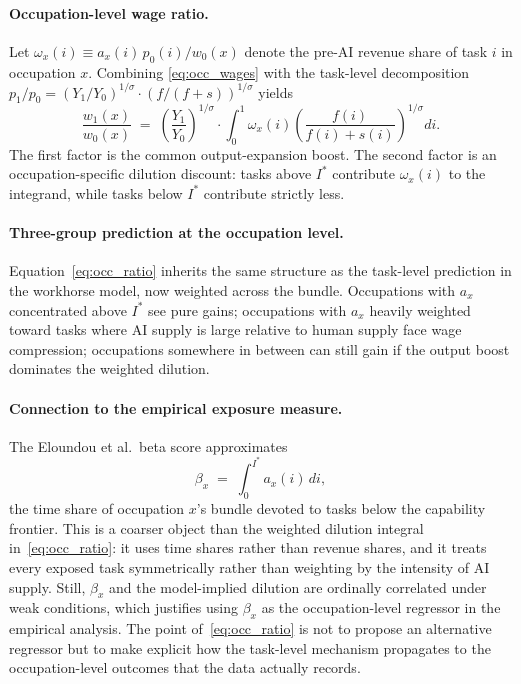\documentclass[11pt]{article}
\theoremstyle{plain}
\theoremstyle{remark}
\begin{document}
\paragraph{Occupation-level wage ratio.}
Let $\omega_x(i) \equiv a_x(i)\, p_0(i) / w_0(x)$ denote the pre-AI
revenue share of task $i$ in occupation $x$.  Combining
\eqref{eq:occ_wages} with the task-level decomposition $p_1/p_0 = (Y_1/Y_0)^{1/\sigma} \cdot (f/(f+s))^{1/\sigma}$ yields
\begin{equation}
  \frac{w_1(x)}{w_0(x)}
  \;=\; \left(\frac{Y_1}{Y_0}\right)^{1/\sigma}
  \cdot \int_0^1 \omega_x(i) \left(\frac{f(i)}{f(i)+s(i)}\right)^{1/\sigma} di.
  \label{eq:occ_ratio}
\end{equation}
The first factor is the common output-expansion boost.  The second
factor is an occupation-specific dilution discount: tasks above $I^*$
contribute $\omega_x(i)$ to the integrand, while tasks below $I^*$
contribute strictly less.

\paragraph{Three-group prediction at the occupation level.}
Equation~\eqref{eq:occ_ratio} inherits the same structure as the
task-level prediction in the workhorse model, now weighted across the
bundle.  Occupations with $a_x$ concentrated above $I^*$ see pure gains;
occupations with $a_x$ heavily weighted toward tasks where AI supply is
large relative to human supply face wage compression; occupations
somewhere in between can still gain if the output boost dominates the
weighted dilution.

\paragraph{Connection to the empirical exposure measure.}
The Eloundou et al.\ beta score approximates
\[
  \beta_x \;=\; \int_0^{I^*} a_x(i)\, di,
\]
the time share of occupation $x$'s bundle devoted to tasks below the
capability frontier.  This is a coarser object than the weighted
dilution integral in~\eqref{eq:occ_ratio}: it uses time shares rather
than revenue shares, and it treats every exposed task symmetrically
rather than weighting by the intensity of AI supply.  Still, $\beta_x$
and the model-implied dilution are ordinally correlated under weak
conditions, which justifies using $\beta_x$ as the occupation-level
regressor in the empirical analysis.  The point of~\eqref{eq:occ_ratio}
is not to propose an alternative regressor but to make explicit how
the task-level mechanism propagates to the occupation-level outcomes
that the data actually records.
\end{document}
